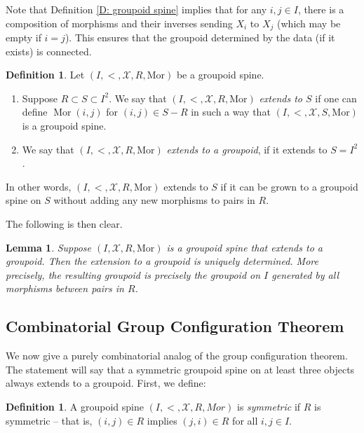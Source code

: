 \documentclass{amsart}
\newtheorem{lemma}[theorem]{Lemma}
\theoremstyle{definition}
\newtheorem{definition}[theorem]{Definition}
\begin{document}
Note that Definition \ref{D: groupoid spine} implies that for any $i,j\in I$, there is a composition of morphisms and their inverses sending $X_i$ to $X_j$ (which may be empty if $i=j$). This ensures that the groupoid determined by the data (if it exists) is connected. 

\begin{definition}
    Let $(I,<,\mathcal X,R,\mathrm{Mor})$ be a groupoid spine. 
    \begin{enumerate}
        \item Suppose $R\subset S\subset I^2$. We say that $(I,<,\mathcal X,R,\mathrm{Mor})$ \textit{extends to $S$} if one can define $\operatorname{Mor}(i,j)$ for $(i,j)\in S-R$ in such a way that $(I,<,\mathcal X,S,\mathrm{Mor})$ is a groupoid spine.
        \item We say that $(I,<,\mathcal X,R,\mathrm{Mor})$ \textit{extends to a groupoid}, if it extends to $S=I^2$.
    \end{enumerate}
\end{definition}

In other words, $(I,<,\mathcal X,R,\mathrm{Mor})$ extends to $S$ if it can be grown to a groupoid spine on $S$ without adding any new morphisms to pairs in $R$.

The following is then clear.

\begin{lemma} Suppose $(I,\mathcal X,R,\mathrm{Mor})$ is a groupoid spine that extends to a groupoid. Then the extension to a groupoid is uniquely determined. More precisely, the resulting groupoid is precisely the groupoid on $I$ generated by all morphisms between pairs in $R$.
\end{lemma}

\subsection{Combinatorial Group Configuration Theorem}

We now give a purely combinatorial analog of the group configuration theorem. The statement will say that a symmetric groupoid spine on at least three objects always extends to a groupoid. First, we define:

\begin{definition}
    A groupoid spine $(I,<,\mathcal X,R,Mor)$ is \textit{symmetric} if $R$ is symmetric -- that is, $(i,j)\in R$ implies $(j,i)\in R$ for all $i,j\in I$.
\end{definition}
\end{document}
